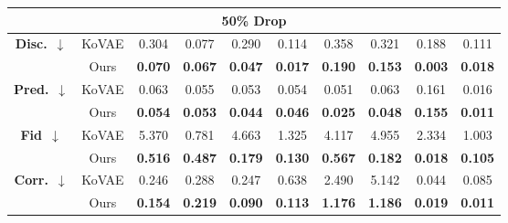 \documentclass{article}
\theoremstyle{plain}
\theoremstyle{definition}
\theoremstyle{remark}
\begin{document}
\begin{table}[!t]
{\begin{tabular}{cc|cccccccc}
    \multicolumn{10}{c}{\textbf{50\% Drop}} \\
    \midrule
    \multirow{2}{*}{\textbf{Disc.}~$\downarrow$}
      & KoVAE  & 0.304 & 0.077 & 0.290 & 0.114 & 0.358 & 0.321 & 0.188 & 0.111 \\
      & Ours   & \cellcolor{blue!10}\textbf{0.070}
               & \cellcolor{blue!10}\textbf{0.067}
               & \cellcolor{blue!10}\textbf{0.047}
               & \cellcolor{blue!10}\textbf{0.017}
               & \cellcolor{blue!10}\textbf{0.190}
               & \cellcolor{blue!10}\textbf{0.153}
               & \cellcolor{blue!10}\textbf{0.003}
               & \cellcolor{blue!10}\textbf{0.018} \\
    \midrule
    \multirow{2}{*}{\textbf{Pred.}~$\downarrow$} 
      & KoVAE  & 0.063 & 0.055 & 0.053 & 0.054 & 0.051 & 0.063 & 0.161 & 0.016 \\
      & Ours   & \cellcolor{blue!10}\textbf{0.054}
               & \cellcolor{blue!10}\textbf{0.053}
               & \cellcolor{blue!10}\textbf{0.044}
               & \cellcolor{blue!10}\textbf{0.046}
               & \cellcolor{blue!10}\textbf{0.025}
               & \cellcolor{blue!10}\textbf{0.048}
               & \cellcolor{blue!10}\textbf{0.155}
               & \cellcolor{blue!10}\textbf{0.011} \\
    \midrule
    \multirow{2}{*}{\textbf{Fid}~$\downarrow$}     
      & KoVAE  & 5.370 & 0.781 & 4.663 & 1.325 & 4.117 & 4.955 & 2.334 & 1.003 \\
      & Ours   & \cellcolor{blue!10}\textbf{0.516}
               & \cellcolor{blue!10}\textbf{0.487}
               & \cellcolor{blue!10}\textbf{0.179}
               & \cellcolor{blue!10}\textbf{0.130}
               & \cellcolor{blue!10}\textbf{0.567}
               & \cellcolor{blue!10}\textbf{0.182}
               & \cellcolor{blue!10}\textbf{0.018}
               & \cellcolor{blue!10}\textbf{0.105} \\
    \midrule
    \multirow{2}{*}{\textbf{Corr.}~$\downarrow$}     
      & KoVAE  & 0.246 & 0.288 & 0.247 & 0.638 & 2.490 & 5.142 & 0.044 & 0.085 \\
      & Ours   & \cellcolor{blue!10}\textbf{0.154}
               & \cellcolor{blue!10}\textbf{0.219}
               & \cellcolor{blue!10}\textbf{0.090}
               & \cellcolor{blue!10}\textbf{0.113}
               & \cellcolor{blue!10}\textbf{1.176}
               & \cellcolor{blue!10}\textbf{1.186}
               & \cellcolor{blue!10}\textbf{0.019}
               & \cellcolor{blue!10}\textbf{0.011} \\
    \midrule


\end{tabular}}
\end{table}
\end{document}
